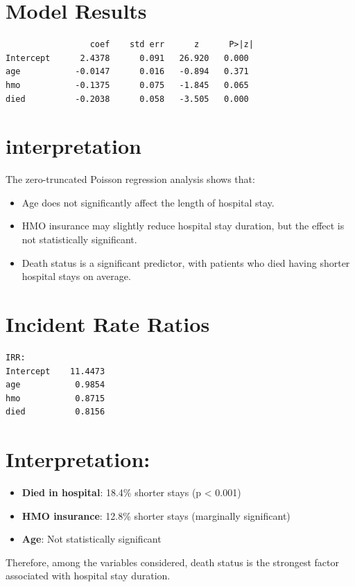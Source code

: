\documentclass[12pt, a4paper]{article}
\begin{document}
\section*{Model Results}
\begin{outputbox}
\begin{verbatim}
                 coef    std err      z      P>|z|
Intercept      2.4378      0.091   26.920   0.000
age           -0.0147      0.016   -0.894   0.371
hmo           -0.1375      0.075   -1.845   0.065
died          -0.2038      0.058   -3.505   0.000
\end{verbatim}
\end{outputbox}

\section{interpretation}

The zero-truncated Poisson regression analysis shows that:

\begin{itemize}
    \item Age does not significantly affect the length of hospital stay. 
    \item HMO insurance may slightly reduce hospital stay duration, but the effect is not statistically significant. 
    \item Death status is a significant predictor, with patients who died having shorter hospital stays on average. 
\end{itemize}


\section*{Incident Rate Ratios}
\begin{outputbox}
\begin{verbatim}
IRR:
Intercept    11.4473
age           0.9854
hmo           0.8715
died          0.8156
\end{verbatim}
\end{outputbox}

\section*{Interpretation:}
\begin{itemize}
    \item \textbf{Died in hospital}: 18.4\% shorter stays (p < 0.001)
    \item \textbf{HMO insurance}: 12.8\% shorter stays (marginally significant)
    \item \textbf{Age}: Not statistically significant
\end{itemize}
Therefore, among the variables considered, death status is the strongest factor associated with hospital stay duration.
\end{document}

